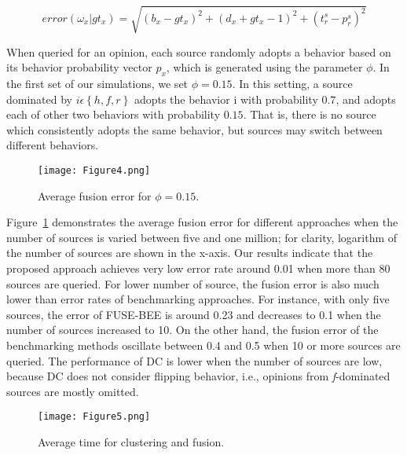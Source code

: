 \documentclass[a4,12pt]{ozu-thesis}
\begin{document}
\begin{equation}
error\left ( \omega _{x} | gt_{x}\right ) = \sqrt{\left ( b_{x} - gt_{x}\right )^{2} + \left ( d_{x} + gt_{x} - 1\right )^{2} + \left ( t_{r}^{s} - p_{r}^{s}\right )^{2}}
\end{equation}


When queried for an opinion, each source randomly adopts a behavior based on its behavior probability vector $p_{x}$, which is generated using the parameter $\phi$. In the first set of our simulations, we set $\phi = 0.15.$ In this setting, a source dominated by $ i \epsilon \left \{ h, f, r \right \}$ adopts the behavior i with probability $0.7$, and adopts each of other two behaviors with probability $0.15$. That is, there is no source which consistently adopts the same behavior, but sources may switch between different behaviors.

\begin{figure}[h]
\begin{center}
\texttt{[image: Figure4.png]}
\end{center}
\caption{Average fusion error for $\phi = 0.15$.}
\label{fig:fusErr}
\end{figure}

Figure~\ref{fig:fusErr} demonstrates the average fusion error for different approaches when the number of sources is varied between five and one million; for clarity, logarithm of the number of sources are shown in the x-axis. Our results indicate that the proposed approach achieves very low error rate around 0.01 when more than 80 sources are queried. For lower number of source, the fusion error is also much lower than error rates of benchmarking approaches. For instance, with only five sources, the error of FUSE-BEE is around 0.23 and decreases to 0.1 when the number of sources increased to 10. On the other hand, the fusion error of the benchmarking methods oscillate between 0.4 and 0.5 when 10 or more sources are queried. The performance of DC is lower when the number of sources are low, because DC does not consider flipping behavior, i.e., opinions from \textit{f}-dominated sources are mostly omitted.

\begin{figure}[h]
\begin{center}
\texttt{[image: Figure5.png]}
\end{center}
\caption{Average time for clustering and fusion.}
\label{fig:clusFusion}
\end{figure}
\end{document}
